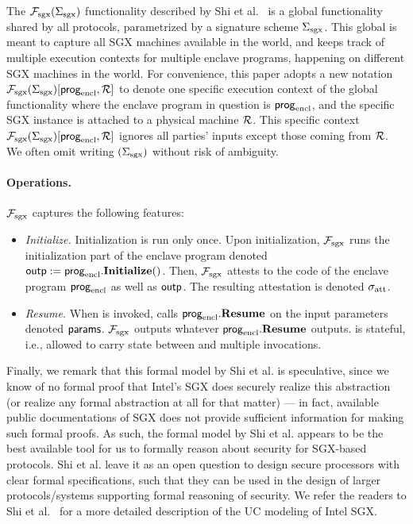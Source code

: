 The $\mathcal{F}_{\textrm{sgx}}({\Sigma_{\textrm{sgx}}})$ functionality described by Shi et al.~\cite{sgxsok} %
is a global functionality shared by all protocols, parametrized
by a signature scheme ${\Sigma_{\textrm{sgx}}}$.
This global \fsgx 
is meant to capture all SGX machines available in the world,
and keeps track of 
multiple execution contexts
for multiple enclave programs, happening on different SGX machines in the world.
For convenience, 
this paper adopts a new notation
$\mathcal{F}_{\textrm{sgx}}({\Sigma_{\textrm{sgx}}})[{\sf prog}_{\textrm{encl}}, \mathcal{R}]$
to denote 
one specific execution context of the global \fsgx
functionality where the enclave program in question is ${\sf prog}_{\textrm{encl}}$,
and the specific SGX instance is attached to a physical machine $\mathcal{R}$.
This specific context 
$\mathcal{F}_{\textrm{sgx}}({\Sigma_{\textrm{sgx}}})[{\sf prog}_{\textrm{encl}}, \mathcal{R}]$
ignores all parties' inputs except those coming from $\mathcal{R}$.
We often omit writing $({\Sigma_{\textrm{sgx}}})$ without risk of ambiguity.


\paragraph{Operations.}
$\mathcal{F}_{\textrm{sgx}}$ captures the following features:
\begin{itemize}[leftmargin=5mm]
\item
{\it Initialize.}
Initialization is run only once.
Upon initialization, $\mathcal{F}_{\textrm{sgx}}$
runs the initialization part of the enclave program
denoted ${\sf outp} := {\sf prog}_{\textrm{encl}}.{\bf Initialize}()$.
Then, $\mathcal{F}_{\textrm{sgx}}$ 
attests to the code of the enclave program ${\sf prog}_{\textrm{encl}}$ 
as well as ${\sf outp}$.
The resulting attestation is denoted 
${\sigma_{\textrm{att}}}$.
\item
{\it Resume.}
When  is invoked,
\fsgx 
calls ${\sf prog}_{\textrm{encl}}.{\bf Resume}$
on the input parameters denoted ${\sf params}$.
$\mathcal{F}_{\textrm{sgx}}$ 
outputs whatever ${\sf prog}_{\textrm{encl}}.{\bf Resume}$ outputs.
\fsgx is stateful, i.e., allowed to carry state
between  and multiple 
invocations.
\end{itemize}

Finally, we remark that this formal model by Shi et al.
is speculative,   
since we know of no formal
proof that Intel's SGX does securely realize this abstraction (or 
realize any formal
abstraction at all for that matter) --- 
in fact, available public documentations of SGX
does not provide sufficient information for making such formal proofs. 
As such, the formal model by Shi et al. 
appears to be the best available tool for us to 
formally reason about 
security 
for SGX-based protocols. 
Shi et al. leave it as an open question to design secure processors
with clear formal specifications, such that 
they can be used in the design of larger protocols/systems 
supporting formal reasoning of security.
We refer the readers to Shi et al.~\cite{sgxsok} 
for a more detailed description of the UC modeling of Intel SGX.


